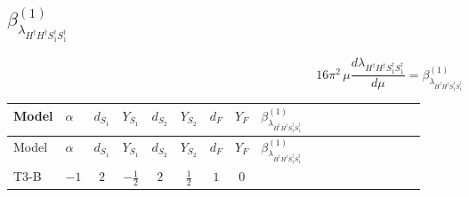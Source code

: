 \documentclass{article}
\begin{document}
\begin{landscape}
\section*{$\beta_{\lambda_{H^\dagger H^\dagger S_1^\dagger S_1^\dagger}}^{(1)}$}
\[16\pi^2\,\mu\frac{d \lambda_{H^\dagger H^\dagger S_1^\dagger S_1^\dagger}}{d\mu}=\beta_{\lambda_{H^\dagger H^\dagger S_1^\dagger S_1^\dagger}}^{(1)}\]
\tiny
\begin{longtable}{@{}llcccccc >{\raggedright\arraybackslash}p{0.54\linewidth}@{}}
\toprule
Model & $\alpha$ & $d_{S_1}$ & $Y_{S_1}$ & $d_{S_2}$ & $Y_{S_2}$ & $d_F$ & $Y_F$ & $\beta_{\lambda_{H^\dagger H^\dagger S_1^\dagger S_1^\dagger}}^{(1)}$ \\
\midrule
\endfirsthead
\toprule
Model & $\alpha$ & $d_{S_1}$ & $Y_{S_1}$ & $d_{S_2}$ & $Y_{S_2}$ & $d_F$ & $Y_F$ & $\beta_{\lambda_{H^\dagger H^\dagger S_1^\dagger S_1^\dagger}}^{(1)}$ \\
\midrule
\endhead
T3-B & $-1$ & $2$ & $-\frac{1}{2}$ & $2$ & $\frac{1}{2}$ & $1$ & $0$ & \scriptsize\adjustbox{max width=\linewidth}{$\begin{gathered} {\lambda_{H^\dagger H^\dagger S_1^\dagger S_1^\dagger}} (2 \operatorname{Tr}\!\left({y_1}\,\left({y_1}\right)^{\dagger}\right)+6 \operatorname{Tr}\!\left({Y_d}\,\left({Y_d}\right)^{\dagger}\right)+2 \operatorname{Tr}\!\left({Y_e}\,\left({Y_e}\right)^{\dagger}\right)+6 \operatorname{Tr}\!\left({Y_u}\,\left({Y_u}\right)^{\dagger}\right)) \\ +\left({\lambda_{T3}}\right)^{*} \operatorname{Tr}\!\left({y_2}\,\left({y_1}\right)^{\dagger}\right) \\ -2 {\lambda_{H H^\dagger S_1^\dagger S_2^\dagger}^{\rm Cross}} \left({\lambda_{T3}}\right)^{*} \\ +2 {\lambda_{S_1 S_1^{\dagger 2}S_2^\dagger}} \left({\lambda_{T3}}\right)^{*} \\ -9 {g_2}^2 {\lambda_{H^\dagger H^\dagger S_1^\dagger S_1^\dagger}} \\ -3 {g_Y}^2 {\lambda_{H^\dagger H^\dagger S_1^\dagger S_1^\dagger}} \\ +2 {\lambda_H} {\lambda_{H^\dagger H^\dagger S_1^\dagger S_1^\dagger}} \\ +8 {\lambda_{H1}} {\lambda_{H^\dagger H^\dagger S_1^\dagger S_1^\dagger}} \\ +\frac{4 {\lambda_{H1}^{\rm Adj}} {\lambda_{H^\dagger H^\dagger S_1^\dagger S_1^\dagger}}}{3} \\ +2 {\lambda_{H^\dagger H^\dagger S_1^\dagger S_1^\dagger}} {\lambda_{S_1}} \\ +4 {\lambda_{H^\dagger H^\dagger S_2 S_2}} {\lambda_{S_1^{\dagger 2}S_2^{\dagger 2}}}\end{gathered}$} \\

\end{longtable}
\end{landscape}
\end{document}
